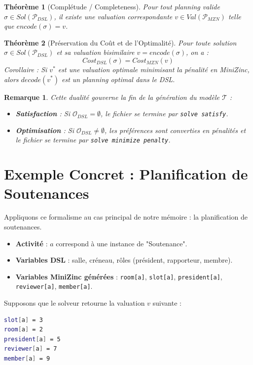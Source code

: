 \documentclass[12pt,a4paper]{article}
\newtheorem{theorem}{Théorème}[section]
\newtheorem{remark}{Remarque}[section]
\begin{document}
\begin{theorem}[Complétude / Completeness]
Pour tout planning valide $\sigma \in Sol(\mathcal{P}_{DSL})$, il existe une valuation correspondante $v \in Val(\mathcal{P}_{MZN})$ telle que $encode(\sigma) = v$.
\end{theorem}

\begin{theorem}[Préservation du Coût et de l'Optimalité]
Pour toute solution $\sigma \in Sol(\mathcal{P}_{DSL})$ et sa valuation bisimilaire $v = encode(\sigma)$, on a :
\[ Cost_{DSL}(\sigma) = Cost_{MZN}(v) \]
Corollaire : Si $v^*$ est une valuation optimale minimisant la pénalité en MiniZinc, alors $decode(v^*)$ est un planning optimal dans le DSL.
\end{theorem}
\begin{remark}
Cette dualité gouverne la fin de la génération du modèle $\mathcal{T}$ :
\begin{itemize}
    \item \textbf{Satisfaction} : Si $\mathcal{O}_{DSL} = \emptyset$, le fichier se termine par \texttt{solve satisfy}.
    \item \textbf{Optimisation} : Si $\mathcal{O}_{DSL} \neq \emptyset$, les préférences sont converties en pénalités et le fichier se termine par \texttt{solve minimize penalty}.
\end{itemize}
\end{remark}

\section{Exemple Concret : Planification de Soutenances}
Appliquons ce formalisme au cas principal de notre mémoire : la planification de soutenances.
\begin{itemize}
    \item \textbf{Activité} : $a$ correspond à une instance de "Soutenance".
    \item \textbf{Variables DSL} : salle, créneau, rôles (président, rapporteur, membre).
    \item \textbf{Variables MiniZinc générées} : \texttt{room[a]}, \texttt{slot[a]}, \texttt{president[a]}, \texttt{reviewer[a]}, \texttt{member[a]}.
\end{itemize}

Supposons que le solveur retourne la valuation $v$ suivante :
\begin{lstlisting}[language=bash]
slot[a] = 3
room[a] = 2
president[a] = 5
reviewer[a] = 7
member[a] = 9
\end{lstlisting}
\end{document}

